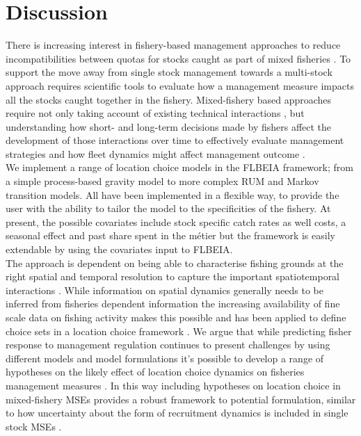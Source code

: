 \documentclass[12pt, halfline, a4paper]{ouparticle}
\begin{document}
\section{Discussion}
\label{dis}

There is increasing interest in fishery-based management approaches to reduce
incompatibilities between quotas for stocks caught as part of mixed fisheries
\citep{Ulrich2016, Garcia2020}. To support the move away from single stock
management towards a multi-stock approach requires scientific tools to evaluate
how a management measure impacts all the stocks caught together in the fishery.
Mixed-fishery based approaches require not only taking account of existing
technical interactions \citep{Ulrich2011, Garcia2017}, but understanding how
short- and long-term decisions made by fishers affect the development of those
interactions over time to effectively evaluate management strategies and how
fleet dynamics might affect management outcome \citep{Marchal2013}. \\

We implement a range of location choice models in the FLBEIA framework; from a
simple process-based gravity model to more complex RUM and Markov transition
models. All have been implemented in a flexible way, to provide the user with
the ability to tailor the model to the specificities of the fishery. At
present, the possible covariates include stock specific catch rates as well
costs, a seasonal effect and past share spent in the métier but the framework
is easily extendable by using the covariates input to FLBEIA. \\

The approach is dependent on being able to characterise fishing grounds at the
right spatial and temporal resolution to capture the important spatiotemporal
interactions \citep{Dolder2020a}. While information on spatial dynamics
generally needs to be inferred from fisheries dependent information the
increasing availability of fine scale data on fishing activity makes this
possible \citep{Gerritsen2012, Mateo2016} and has been applied to define choice
sets in a location choice framework \citep{Hynes2016}. We argue that while
predicting fisher response to management regulation continues to present
challenges \citep{Andersen2010a} by using different models and model
formulations it's possible to develop a range of hypotheses on the likely
effect of location choice dynamics on fisheries management measures
\citep[][\textit{in prep}]{Dolder2020}. In this way including hypotheses on
location choice in mixed-fishery MSEs provides a robust framework to potential
formulation, similar to how uncertainty about the form of recruitment dynamics
is included in single stock MSEs \citep[e.g.][]{ICES2020}.  \\
\end{document}
